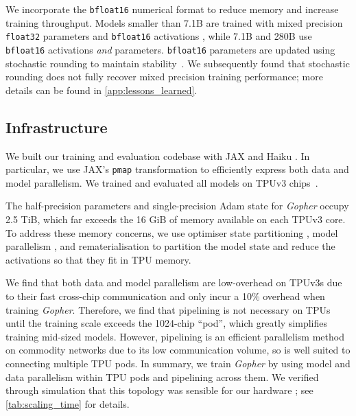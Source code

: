 \documentclass[11pt, a4paper, logo, internal, copyright, nonumbering]{deepmind}
\newcommand{\gopher}{\textit{Gopher}\xspace}
\begin{document}
We incorporate the \texttt{bfloat16} numerical format to reduce memory and increase training throughput. Models smaller than 7.1B are trained with mixed precision \texttt{float32} parameters and \texttt{bfloat16} activations \citep{micikevicius2017mixed}, while 7.1B and 280B use \texttt{bfloat16} activations \textit{and} parameters. \texttt{bfloat16} parameters are updated using stochastic rounding to maintain stability~\citep{gupta2015deep}.
We subsequently found that stochastic rounding does not fully recover mixed precision training performance; more details can be found in \autoref{app:lessons_learned}.

\subsection{Infrastructure}
\label{method:infra}
We built our training and evaluation codebase with JAX \citep{jax2018github} and Haiku \citep{haiku2020github}.
In particular, we use JAX's \texttt{pmap} transformation to efficiently express both data and model parallelism.
We trained and evaluated all models on TPUv3 chips~\citep{tpuacm}.

The half-precision parameters and single-precision Adam state for \gopher occupy 2.5 TiB, which far exceeds the 16 GiB of memory available on each TPUv3 core. To address these memory concerns, we use optimiser state partitioning \citep{rajbhandari2020zero}, model parallelism \citep{shoeybi2019megatron}, and rematerialisation \citep{griewank2000algorithm} to partition the model state and reduce the activations so that they fit in TPU memory.

We find that both data and model parallelism are low-overhead on TPUv3s due to their fast cross-chip communication and only incur a 10\% overhead when training \gopher. Therefore, we find that pipelining \citep{huang2019gpipe} is not necessary on TPUs until the training scale exceeds the 1024-chip ``pod'', which greatly simplifies training mid-sized models.
However, pipelining is an efficient parallelism method on commodity networks due to its low communication volume, so is well suited to connecting multiple TPU pods.
In summary, we train \gopher by using model and data parallelism within TPU pods and pipelining across them. We verified through simulation that this topology was sensible for our hardware \citep{automap2021}; see \autoref{tab:scaling_time} for details.
\end{document}
